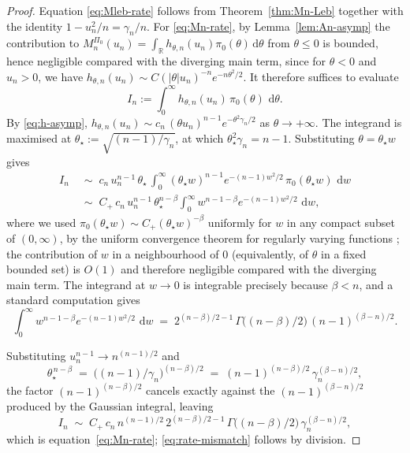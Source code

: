 \documentclass[12pt, a4paper]{report}
\newcommand{\dd}{\,\mathrm{d}}
\newcommand{\1}{\mathbf{1}}
\begin{document}
\begin{proof}
Equation \eqref{eq:Mleb-rate} follows from Theorem~\ref{thm:Mn-Leb}
together with the identity \(1-u_n^2/n=\gamma_n/n\). For
\eqref{eq:Mn-rate}, by Lemma~\ref{lem:An-asymp} the contribution to
\(M_n^{\Pi_0}(u_n)=\int_\mathbb{R} h_{\theta,n}(u_n)\pi_0(\theta)\dd\theta\)
from \(\theta\leq 0\) is bounded, hence negligible compared with the diverging main term, since for
\(\theta<0\) and \(u_n>0\), we have
\(h_{\theta,n}(u_n)\sim C(|\theta| u_n)^{-n}e^{-n\theta^2/2}\). It
therefore suffices to evaluate
\[
   I_n:=\int_0^\infty h_{\theta,n}(u_n)\,\pi_0(\theta)\,\dd\theta.
\]
By \eqref{eq:h-asymp},
\(h_{\theta,n}(u_n)\sim c_n\,(\theta u_n)^{n-1}e^{-\theta^2\gamma_n/2}\)
as \(\theta\to+\infty\). The integrand is maximised at \(\theta_\star:=\sqrt{(n-1)/\gamma_n}\), at which
\(\theta_\star^2\gamma_n=n-1\). Substituting \(\theta=\theta_\star w\)
gives
\allowdisplaybreaks
\begin{align*}
  I_n
  &\;\sim\; c_n\,u_n^{n-1}\,\theta_\star\,
     \int_0^\infty (\theta_\star w)^{n-1}e^{-(n-1)w^2/2}\,
     \pi_0(\theta_\star w)\,\dd w\\
  &\;\sim\; C_+\,c_n\,u_n^{n-1}\,\theta_\star^{n-\beta}
     \int_0^\infty w^{n-1-\beta}e^{-(n-1)w^2/2}\,\dd w,
\end{align*}
where we used \(\pi_0(\theta_\star w)\sim C_+(\theta_\star w)^{-\beta}\) uniformly for \(w\) in any compact subset of \((0,\infty)\), by the uniform convergence theorem for regularly varying functions \cite[Thm.~1.2.1]{bingham1989regular}; the contribution of \(w\) in a neighbourhood of \(0\) (equivalently, of \(\theta\) in a
fixed bounded set) is \(O(1)\) and therefore negligible compared with the
diverging main term.
The integrand at
\(w\to 0\) is integrable precisely because \(\beta<n\), and a
standard computation gives
\[
  \int_0^\infty w^{n-1-\beta}e^{-(n-1)w^2/2}\,\dd w
  \;=\; 2^{(n-\beta)/2-1}\,\Gamma\!\bigl((n-\beta)/2\bigr)\,
        (n-1)^{(\beta-n)/2}.
\]

Substituting $u_n^{n-1} \to n^{(n-1)/2}$ and
\[
  \theta_\star^{\,n-\beta} 
  \;=\; \bigl((n-1)/\gamma_n\bigr)^{(n-\beta)/2}
  \;=\; (n-1)^{(n-\beta)/2}\, \gamma_n^{(\beta-n)/2},
\]
the factor $(n-1)^{(n-\beta)/2}$ cancels exactly against the 
$(n-1)^{(\beta-n)/2}$ produced by the Gaussian integral, leaving
\[
  I_n \;\sim\; C_+\, c_n\, n^{(n-1)/2}\, 2^{(n-\beta)/2-1}\, 
  \Gamma\!\bigl((n-\beta)/2\bigr)\, \gamma_n^{(\beta-n)/2},
\]
which is equation~\eqref{eq:Mn-rate}; \eqref{eq:rate-mismatch} follows by division.
\end{proof}
\end{document}
